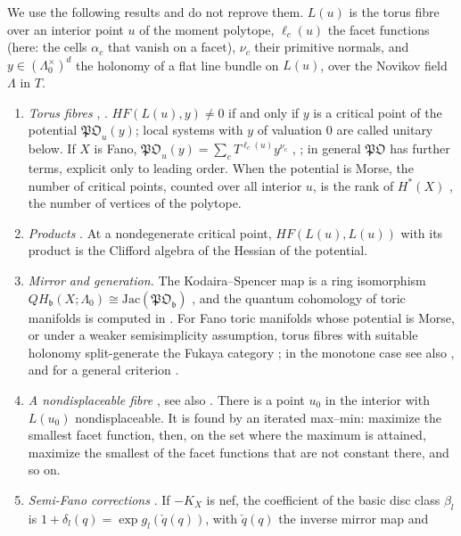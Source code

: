 \documentclass[11pt]{article}
\theoremstyle{definition}
\theoremstyle{remark}
\begin{document}
We use the following results and do not reprove them. $L(u)$ is the torus fibre over an interior point $u$ of the moment
polytope, $\ell_c(u)$ the facet functions (here: the cells $\alpha_c$ that vanish on a facet), $\nu_c$ their primitive normals, and
$y\in(\Lambda_0^{\times})^d$ the holonomy of a flat line bundle on $L(u)$, over the Novikov field $\Lambda$ in $T$.
\begin{enumerate}[label=(T\arabic*),leftmargin=*]
\item \emph{Torus fibres} \cite{ChoOh2006}, \cite[Thms.~1.3, 4.10]{FOOO2010}. $HF(L(u),y)\ne0$ if and only if $y$ is a critical
  point of the potential $\mathfrak{PO}_u(y)$; local systems with $y$ of valuation $0$ are called unitary below. If $X$ is Fano, $\mathfrak{PO}_u(y)=\sum_cT^{\ell_c(u)}y^{\nu_c}$ \cite{ChoOh2006},
  \cite[Thm.~4.5]{FOOO2010}; in general $\mathfrak{PO}$ has further terms, explicit only to leading order. When the potential is Morse, the number of critical
  points, counted over all interior $u$, is the rank of $H^*(X)$ \cite{ChoOh2006}, the number of vertices of the polytope.
\item \emph{Products} \cite{Cho2005}. At a nondegenerate critical point, $HF(L(u),L(u))$ with its product is the Clifford
  algebra of the Hessian of the potential.
\item \emph{Mirror and generation.} The Kodaira--Spencer map is a ring isomorphism $QH_{\mathfrak b}(X;\Lambda_0)\cong
  \mathrm{Jac}(\mathfrak{PO}_{\mathfrak b})$ \cite[Thm.~1.1.1]{FOOO2016}, and the quantum cohomology of toric manifolds is computed in
  \cite{Batyrev1993}. For Fano toric manifolds whose potential is Morse, or under a weaker semisimplicity assumption, torus fibres
  with suitable holonomy split-generate the Fukaya category \cite{Ritter2016}; in the monotone case see also \cite{EvansLekili2019},
  and for a general criterion \cite{AFOOO2026}.
\item \emph{A nondisplaceable fibre} \cite[Thm.~1.5, \S9]{FOOO2010}, see also \cite{McDuff2011}. There is a point $u_0$ in the
  interior with $L(u_0)$ nondisplaceable. It is found by an iterated max--min: maximize the smallest facet function, then, on the
  set where the maximum is attained, maximize the smallest of the facet functions that are not constant there, and so on.
\item \emph{Semi-Fano corrections} \cite[Thms.~1.1, 1.2, eq.~(1.1)]{CLLT2017}. If $-K_X$ is nef, the coefficient of the basic disc
  class $\beta_l$ is $1+\delta_l(q)=\exp g_l(\check q(q))$, with $\check q(q)$ the inverse mirror map and

\end{enumerate}
\end{document}
